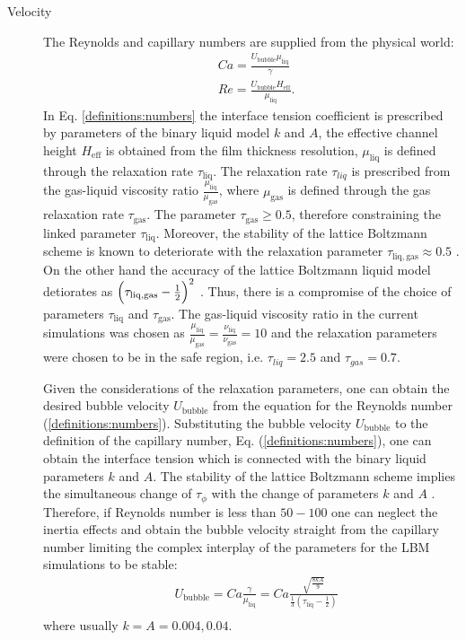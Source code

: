 \documentclass[preprint,12pt]{elsarticle}
\begin{document}
\begin{description}
\item[Velocity] The Reynolds and capillary numbers are supplied from the physical world:
\begin{equation}
\label{definitions:numbers}
\begin{aligned}
&Ca=\frac{U_{\mathrm{bubble}} \mu_{\mathrm{liq}}}{\gamma} \\
&Re=\frac{U_{\mathrm{bubble}} H_{\mathrm{eff}}}{\mu_{\mathrm{liq}}}.
\end{aligned}
\end{equation}
In Eq. \eqref{definitions:numbers} the interface tension coefficient is prescribed by parameters of
the binary liquid model $k$ and $A$, the effective channel height $H_{\mathrm{eff}}$ is obtained
from the film thickness resolution, $\mu_{\mathrm{liq}}$ is defined through the relaxation rate
$\tau_{\mathrm{liq}}$. The relaxation rate $\tau_{liq}$ is prescribed from the gas-liquid viscosity
ratio $\frac{\mu_{\mathrm{liq}}}{\mu_{\mathrm{gas}}}$, where $\mu_{\mathrm{gas}}$ is defined through
the gas relaxation rate $\tau_{\mathrm{gas}}$. The parameter $\tau_{\mathrm{gas}}\geq 0.5$, therefore
 constraining the linked parameter $\tau_{\mathrm{liq}}$. Moreover,
the stability of the lattice Boltzmann scheme is known to deteriorate with the relaxation parameter
$\tau_{\mathrm{liq},\mathrm{gas}}\approx 0.5$ \cite{kuzmin-trt-stability}. On the other hand the
accuracy of the lattice Boltzmann liquid model detiorates as
$\Bigl(\tau_{\mathrm{liq},\mathrm{gas}}-\frac{1}{2}\Bigr)^2$ \cite{ginzburg-trt-simple-hydro}. Thus,
there is a compromise of the choice of parameters $\tau_{\mathrm{liq}}$ and $\tau_{\mathrm{gas}}$.
The gas-liquid viscosity ratio in the current simulations was chosen as
$\frac{\mu_{\mathrm{liq}}}{\mu_{\mathrm{gas}}}=\frac{\nu_{\mathrm{liq}}}{\nu_{\mathrm{gas}}}=10$ and
the relaxation parameters were chosen to be
in the safe region, i.e. $\tau_{liq}=2.5$ and $\tau_{gas}=0.7$. 

Given the considerations of the relaxation parameters, one can obtain the desired bubble velocity
$U_{\mathrm{bubble}}$ from the equation for the Reynolds number (\ref{definitions:numbers}).
Substituting the bubble velocity $U_{\mathrm{bubble}}$ to the definition of the capillary number,
Eq. (\ref{definitions:numbers}), one can obtain the interface tension which is connected with the
binary liquid parameters $k$ and $A$. The stability of the lattice Boltzmann scheme implies the
simultaneous change of $\tau_{\phi}$ with the change of parameters $k$ and $A$
\cite{pagonabarraga-parameters}. Therefore, if Reynolds number is less than
$50-100$ one can neglect the inertia effects and obtain the bubble velocity straight from the
capillary number limiting the complex interplay of the parameters for the LBM simulations to be
stable: 
\begin{equation}
\begin{aligned}
&U_{\mathrm{bubble}}=Ca \frac{\gamma}{\mu_{\mathrm{liq}}}=Ca \frac{\sqrt{\frac{8 k
A}{9}}}{\frac{1}{3}(\tau_{\mathrm{liq}}-\frac{1}{2})}\\
\end{aligned}
\end{equation}
where usually $k=A=0.004,0.04$.


\end{description}
\end{document}
